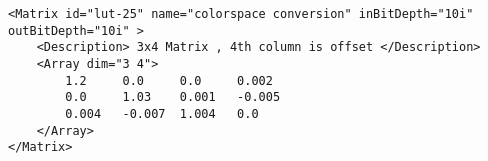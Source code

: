 \begin{lstlisting}[caption=Example of a \xml{Matrix} node]
<Matrix id="lut-25" name="colorspace conversion" inBitDepth="10i" outBitDepth="10i" >
    <Description> 3x4 Matrix , 4th column is offset </Description>
    <Array dim="3 4">
        1.2     0.0     0.0     0.002
        0.0     1.03    0.001   -0.005
        0.004   -0.007  1.004   0.0
    </Array>
</Matrix>
\end{lstlisting}
